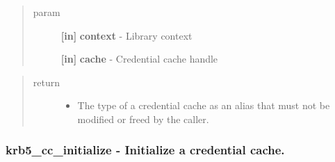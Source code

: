\documentclass[letterpaper,10pt,english]{sphinxmanual}
\begin{document}
\begin{quote}\begin{description}
\item[{param}] \leavevmode
\textbf{{[}in{]}} \textbf{context} - Library context

\textbf{{[}in{]}} \textbf{cache} - Credential cache handle

\end{description}\end{quote}
\begin{quote}\begin{description}
\item[{return}] \leavevmode\begin{itemize}
\item {} 
The type of a credential cache as an alias that must not be modified or freed by the caller.

\end{itemize}

\end{description}\end{quote}


\subsubsection{krb5\_cc\_initialize -  Initialize a credential cache.}
\label{appdev/refs/api/krb5_cc_initialize::doc}\label{appdev/refs/api/krb5_cc_initialize:krb5-cc-initialize-initialize-a-credential-cache}

\begin{fulllineitems}
\label{appdev/refs/api/krb5_cc_initialize:krb5_cc_initialize}
\end{fulllineitems}
\end{document}
